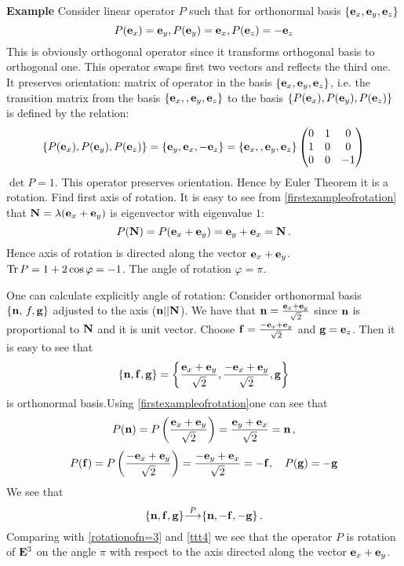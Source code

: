 \documentclass[12pt]{article}
\numberwithin{equation}{section}
\begin{document}
\m


{\bf Example}
   Consider linear operator $P$ such that for orthonormal basis
   $\{{\bf e}_x,{\bf e}_y,{\bf e}_z\}$
                    \begin{equation}\label{firstexampleofrotation}
           P({\bf e}_x)={\bf e}_y, P({\bf e}_y)={\bf e}_x, P({\bf e}_z)=-{\bf e}_z
                    \end{equation}
     This is obviously orthogonal operator since it transforms orthogonal basis to orthogonal one.
This operator swaps first two vectors and reflects the third one. It preserves orientation: matrix of operator in the basis $\{{\bf e}_x,{\bf e}_y,{\bf e}_z\}$,
 i.e. the transition matrix from the basis $\{{\bf e}_x,,{\bf e}_y,{\bf e}_z\}$ to the basis
     $\{P({\bf e}_x),P({\bf e}_y),P({\bf e}_z)\}$ is defined by the relation:
                         \begin{equation*}\label{transitionmatrixforrotation4}
   \{P({\bf e}_x),P({\bf e}_y),P({\bf e}_z)\}=\{{\bf e}_y,{\bf e}_x,-{\bf e}_z\}=
   \{{\bf e}_x,,{\bf e}_y,{\bf e}_z\}\begin{pmatrix}
   0 &1 &0\cr
   1 &0& 0\cr
   0&0&-1\cr
   \end{pmatrix}
                          \end{equation*}
  $\det P=1$.
  This operator preserves orientation. Hence by Euler Theorem it is a rotation.
  Find first axis of rotation.
  It is easy to see from \eqref{firstexampleofrotation} that
  ${\bf N}=\lambda ({\bf e}_x+{\bf e}_y)$ is eigenvector with eigenvalue $1$:
                   $$
                  P({\bf N})=P({\bf e}_x+{\bf e}_y)={\bf e}_y+{\bf e}_x={\bf N}\,.
                   $$
Hence axis of rotation is directed along the vector ${\bf e}_x+{\bf e}_y$.
${\rm Tr\,}P=1+2\cos\varphi=-1$. The 
angle of rotation $\varphi=\pi$.

{\footnotesize One can calculate explicitly angle of rotation:
  Consider orthonormal basis $\{{\bf n},\,f,{\bf g}\}$ adjusted to the axis
  (${\bf n}||{\bf N}$). We have that ${\bf n}={{\bf e}_x+{\bf e}_y\over \sqrt 2}$
 since ${\bf n}$ is proportional to ${\bf N}$ and it is unit vector.
  Choose ${\bf f}={-{\bf e}_x+{\bf e}_y\over \sqrt 2}$ and ${\bf g}={\bf e}_z$.
Then it is easy to see that
                  $$
  \{{\bf n},{\bf f},{\bf g}\}=\left\{{{\bf e}_x+{\bf e}_y\over \sqrt 2},{-{\bf e}_x+{\bf e}_y\over \sqrt 2},{\bf g}\right\}
            $$
   is orthonormal basis.Using \eqref{firstexampleofrotation}one can see
       that
                  $$
P({\bf n})=P\left({{\bf e}_x+{\bf e}_y\over \sqrt 2}\right)={{\bf e}_y+{\bf e}_x\over \sqrt 2}={\bf n}\,,
                  $$
                  $$
   P({\bf f})=P\left({-{\bf e}_x+{\bf e}_y\over \sqrt 2}\right)={-{\bf e}_y+{\bf e}_x\over \sqrt 2}=-{\bf f},\quad
                P({\bf g})=-{\bf g}
                  $$
We see that
          $$
   \{\n,\f,\g\}{\buildrel P\over \longrightarrow}\{\n,-\f,-\g\}\,.
          $$
         Comparing with \eqref{rotationofn=3} and \eqref{ttt4}
 we see that the operator $P$ is rotation of ${\bf E}^3$ on the angle $\pi$ with respect to the axis
         directed along the vector ${\bf e}_x+{\bf e}_y$.



    }
\end{document}
